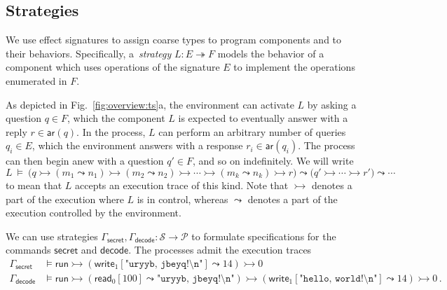 \documentclass[acmsmall,screen,review,anonymous,nonacm]{acmart}
\newcommand{\kw}[1]{\ensuremath{ \mathsf{#1} }}
\begin{document}
\subsection{Strategies} \label{sec:strat} %

We use effect signatures to assign coarse types
to program components and to their behaviors.
Specifically,
a~\emph{strategy} $L : E \twoheadrightarrow F$
models the behavior of a component which
uses operations of the signature $E$ to
implement the operations enumerated in $F$.

As depicted in Fig.~\ref{fig:overview:ts}a,
the environment can activate $L$ by asking a question $q \in F$,
which the component $L$ is expected to eventually answer
with a reply $r \in \kw{ar}(q)$.
In the process,
$L$ can perform an arbitrary number of queries $q_i \in E$,
which the environment answers with a response $r_i \in \kw{ar}(q_i)$.
The process can then begin anew with a question $q' \in F$,
and so on indefinitely.
We will write
\[
  L \:\vDash\: \big(q
    \rightarrowtail (m_1 \leadsto n_1)
    \rightarrowtail (m_2 \leadsto n_2)
    \rightarrowtail \cdots
    \rightarrowtail (m_k \leadsto n_k)
    \rightarrowtail r \big)
  \leadsto \big(q'
    \rightarrowtail \cdots
    \rightarrowtail r' \big)
  \leadsto \cdots
\]
to mean that $L$ accepts an execution trace of this kind.
Note that $\rightarrowtail$ denotes a part of the execution
where $L$ is in control,
whereas $\leadsto$ denotes a part of the execution
controlled by the environment.

\begin{example} \label{ex:decodespec} %
We can use strategies $\Gamma_\kw{secret}, \Gamma_\kw{decode} : \mathcal{S} \rightarrow \mathcal{P}$
to formulate specifications for the commands $\kw{secret}$ and $\kw{decode}$.
The processes admit the execution traces
{\small\begin{align*}
  \Gamma_\kw{secret} &\vDash \kw{run}
    \rightarrowtail (\kw{write}_1[\texttt{"uryyb, jbeyq!\textbackslash{}n"}] \leadsto 14)
    \rightarrowtail 0
  \\
  \Gamma_\kw{decode} &\vDash \kw{run}
    \rightarrowtail (\kw{read}_0[100] \leadsto \texttt{"uryyb, jbeyq!\textbackslash{}n"})
    \rightarrowtail (\kw{write}_1[\texttt{"hello, world!\textbackslash{}n"}] \leadsto 14)
    \rightarrowtail 0
  \,.
\end{align*}}
\end{example}
\end{document}
